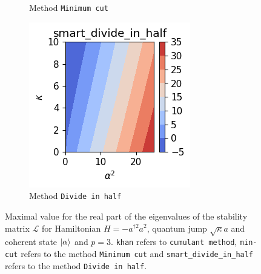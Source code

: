 \begin{figure}[h!]
\begin{subfigure}{0.32\linewidth}
        \caption{Method \texttt{Minimum cut}}
        \label{fig:H_Neg_Self_Kerr_and_losses_1_p_3_rule_min-cut}
    \end{subfigure}
    \hfill
    \begin{subfigure}{0.32\linewidth}
        \centering
        \includegraphics[width=\linewidth]{Pics/H_Neg_Self_Kerr_and_losses_1_p_3_rule_smart_divide_in_half.pdf}
        \caption{Method \texttt{Divide in half}}
        \label{fig:H_Neg_Self_Kerr_and_losses_1_p_3_rule_smart_divide_in_half}
    \end{subfigure}
    \caption{Maximal value for the real part of the eigenvalues of the stability matrix $\mathcal{L}$ for Hamiltonian $H = - a^{\dagger 2} a^2$, quantum jump $\sqrt{\kappa} a$ and coherent state $\ket{\alpha}$ and $p=3$. \texttt{khan} refers to \texttt{cumulant method}, \texttt{min-cut} refers to the method \texttt{Minimum cut} and \texttt{smart\_divide\_in\_half} refers to the method \texttt{Divide in half}.}
    \label{fig:CompStabNegKerr}
\end{figure}

